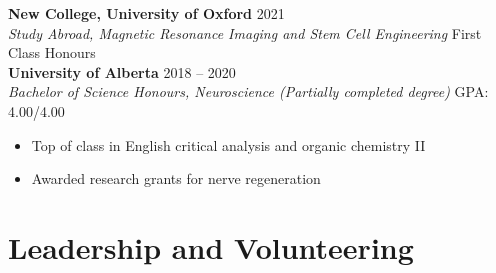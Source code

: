 \documentclass{article}
\begin{document}
\textbf{New College, University of Oxford} \hfill 2021 \\
\textit{Study Abroad, Magnetic Resonance Imaging and Stem Cell Engineering} \hfill First Class Honours \\

\textbf{University of Alberta} \hfill 2018 -- 2020 \\
\textit{Bachelor of Science Honours, Neuroscience (Partially completed degree)} \hfill GPA: 4.00/4.00
\begin{itemize}
    \item Top of class in English critical analysis and organic chemistry II
    \item Awarded research grants for nerve regeneration
\end{itemize}


\section*{\textcolor{my_colour}{Leadership and Volunteering}}
\vspace{-.25em} \hrulefill \vspace{.25em}
\end{document}
